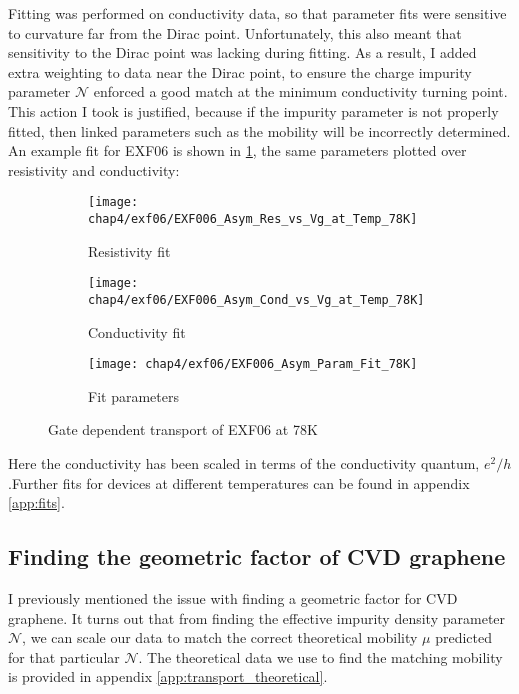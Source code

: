 \documentclass[../Matt_Gebert_Honours_Thesis.tex]{subfiles}
\begin{document}
Fitting was performed on conductivity data, so that parameter fits were sensitive to curvature far from the Dirac point. Unfortunately, this also meant that sensitivity to the Dirac point was lacking during fitting. As a result, I added extra weighting to data near the Dirac point, to ensure the charge impurity parameter $\mathcal{N}$ enforced a good match at the minimum conductivity turning point. This action I took is justified, because if the impurity parameter is not properly fitted, then linked parameters such as the mobility will be incorrectly determined. An example fit for EXF06 is shown in \cref{fig:exf06_78K_VgR}, the same parameters plotted over resistivity and conductivity:
\begin{figure}[H]
	\centering
	\begin{subfigure}{0.4\textwidth}
		\centering
		\texttt{[image: chap4/exf06/EXF006\_Asym\_Res\_vs\_Vg\_at\_Temp\_78K]}
		\caption{Resistivity fit}
	\end{subfigure}
	\begin{subfigure}{0.4\textwidth}
		\centering
		\texttt{[image: chap4/exf06/EXF006\_Asym\_Cond\_vs\_Vg\_at\_Temp\_78K]}
		\caption{Conductivity fit}
	\end{subfigure}
	\begin{subfigure}{0.16\textwidth}
		\centering
		\texttt{[image: chap4/exf06/EXF006\_Asym\_Param\_Fit\_78K]}
		\caption{Fit parameters}
	\end{subfigure}
	\caption[Gate dependent transport of EXF06]{Gate dependent transport of EXF06 at 78K}\label{fig:exf06_78K_VgR}
\end{figure}

Here the conductivity has been scaled in terms of the conductivity quantum, $e^2/h$ .Further fits for devices at different temperatures can be found in appendix \ref{app:fits}.

\subsection{Finding the geometric factor of CVD graphene}\label{sec:findinggeometricfactor}
I previously mentioned the issue with finding a geometric factor for CVD graphene. It turns out that from finding the effective impurity density parameter $\mathcal{N}$, we can scale our data to match the correct theoretical mobility $\mu$ predicted for that particular $\mathcal{N}$. The theoretical data we use to find the matching mobility is provided in appendix \ref{app:transport_theoretical}.
\end{document}
